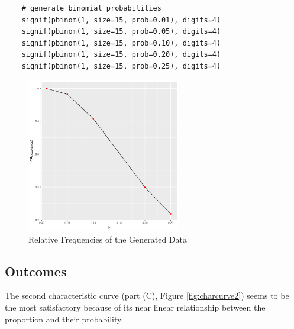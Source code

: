\documentclass{article}
\begin{document}
\begin{lstlisting}
    # generate binomial probabilities
    signif(pbinom(1, size=15, prob=0.01), digits=4)
    signif(pbinom(1, size=15, prob=0.05), digits=4)
    signif(pbinom(1, size=15, prob=0.10), digits=4)
    signif(pbinom(1, size=15, prob=0.20), digits=4)
    signif(pbinom(1, size=15, prob=0.25), digits=4)
\end{lstlisting}

            \begin{figure}[h]
                \begin{center}
                    \includegraphics[width=0.6\textwidth]{charcurve3.png}
                    \caption{Relative Frequencies of the Generated Data} \label{fig:charcurve3}
                \end{center}
            \end{figure}

        \subsection{Outcomes}
            The second characteristic curve (part (C), Figure \ref{fig:charcurve2}) seems to be the most satisfactory because of its near linear relationship between the proportion and their probability.

    \newpage
\end{document}
